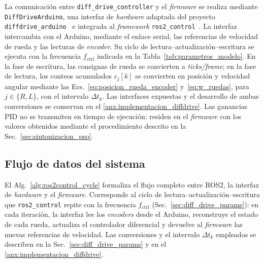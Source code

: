 La comunicación entre \texttt{diff\_drive\_controller} y el \textit{firmware} se
realiza mediante \texttt{DiffDriveArduino}, una interfaz de \textit{hardware} adaptada
del proyecto \texttt{diffdrive\_arduino}~\citep{newans_diffdrive} e integrada
al \textit{framework} \texttt{ros2\_control}~\citep{openrobotics2024ros2control}. La
interfaz intercambia con el \gls{Arduino}, mediante el enlace serial, las
referencias de velocidad de rueda y las lecturas de \textit{encoder}. Su ciclo de lectura--actualización--escritura se ejecuta con la
frecuencia $f_{\mathrm{ctrl}}$ indicada en la
Tabla~\ref{tab:parametros_modelo}.
En la fase de escritura, las consignas de rueda se convierten a
\textit{ticks/frame}; en la fase de
lectura, los conteos acumulados $c_j[k]$ se convierten en posición y
velocidad angular mediante las Ecs.~\eqref{eq:posicion_rueda_encoder}
y~\eqref{eq:w_ruedas}, para $j\in\{R,L\}$, con el intervalo $\Delta t_k$. Las interfaces expuestas y el
desarrollo de ambas conversiones se conservan en el
\ref{anx:implementacion_diffdrive}.
Las ganancias PID no se transmiten en tiempo de ejecución: residen en el
\textit{firmware} con los valores obtenidos mediante el procedimiento descrito en la
Sec.~\ref{sec:sintonizacion_pso}.

\subsection{Flujo de datos del sistema}
\label{sec:flujo_datos}

El Alg.~\ref{alg:ros2control_cycle} formaliza el flujo completo entre
\gls{ROS2}, la interfaz de \textit{hardware} y el \textit{firmware}. Corresponde al ciclo de
lectura--actualización--escritura que \texttt{ros2\_control} repite con la
frecuencia $f_{\mathrm{ctrl}}$ (Sec.~\ref{sec:diff_drive_params}): en cada
iteración, la interfaz lee los \textit{encoders} desde el \gls{Arduino}, reconstruye el
estado de cada rueda, actualiza el controlador diferencial y devuelve al
\textit{firmware} las nuevas referencias de velocidad. Las conversiones y el intervalo
$\Delta t_k$ empleados se describen en la Sec.~\ref{sec:diff_drive_params} y en
el \ref{anx:implementacion_diffdrive}.

